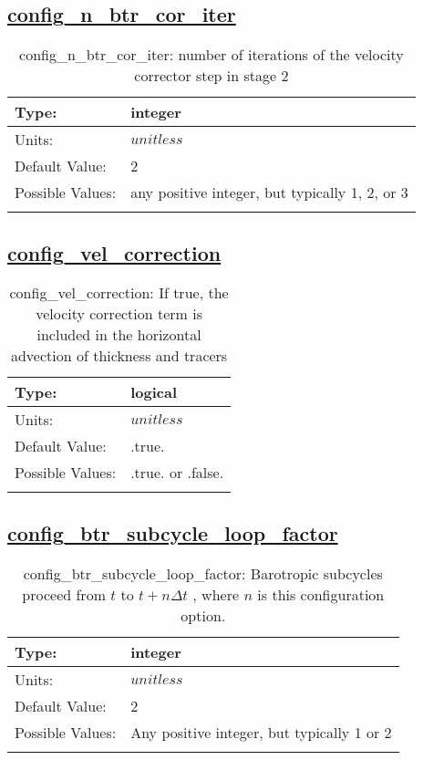 \subsection[config\_n\_btr\_cor\_iter]{\hyperref[sec:nm_tab_split_explicit_ts]{config\_n\_btr\_cor\_iter}}
\label{subsec:nm_sec_config_n_btr_cor_iter}
\begin{center}
\begin{longtable}{| p{2.0in} || p{4.0in} |}
    \hline
    Type: & integer \\
    \hline
    Units: & $unitless$ \\
    \hline
    Default Value: & 2 \\
    \hline
    Possible Values: & any positive integer, but typically 1, 2, or 3 \\
    \hline
    \caption{config\_n\_btr\_cor\_iter: number of iterations of the velocity corrector step in stage 2}
\end{longtable}
\end{center}
\subsection[config\_vel\_correction]{\hyperref[sec:nm_tab_split_explicit_ts]{config\_vel\_correction}}
\label{subsec:nm_sec_config_vel_correction}
\begin{center}
\begin{longtable}{| p{2.0in} || p{4.0in} |}
    \hline
    Type: & logical \\
    \hline
    Units: & $unitless$ \\
    \hline
    Default Value: & .true. \\
    \hline
    Possible Values: & .true. or .false. \\
    \hline
    \caption{config\_vel\_correction: If true, the velocity correction term is included in the horizontal advection of thickness and tracers}
\end{longtable}
\end{center}
\subsection[config\_btr\_subcycle\_loop\_factor]{\hyperref[sec:nm_tab_split_explicit_ts]{config\_btr\_subcycle\_loop\_factor}}
\label{subsec:nm_sec_config_btr_subcycle_loop_factor}
\begin{center}
\begin{longtable}{| p{2.0in} || p{4.0in} |}
    \hline
    Type: & integer \\
    \hline
    Units: & $unitless$ \\
    \hline
    Default Value: & 2 \\
    \hline
    Possible Values: & Any positive integer, but typically 1 or 2 \\
    \hline
    \caption{config\_btr\_subcycle\_loop\_factor:  Barotropic subcycles proceed from  $t$  to  $t+n\Delta t$ , where  $n$  is this configuration option.}
\end{longtable}
\end{center}
